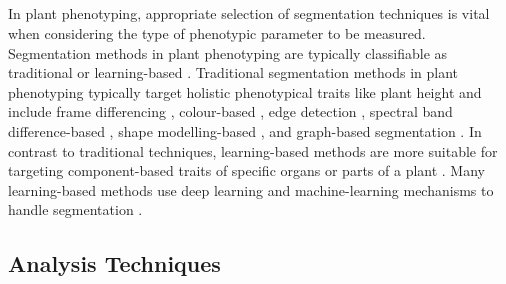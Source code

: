 \subparagraph{}
In plant phenotyping, appropriate selection of segmentation techniques is vital when considering the type of phenotypic parameter to be measured. Segmentation methods in plant phenotyping are typically classifiable as traditional or learning-based \cite{choudhurySegmentationTechniquesChallenges2020}. Traditional segmentation methods in plant phenotyping typically target holistic phenotypical traits like plant height and include frame differencing \cite{daschoudhuryHolisticComponentPlant2018}, colour-based \cite{hamudaSurveyImageProcessing2016a}, edge detection \cite{wangImageSegmentationOverlapping2018}, spectral band difference-based \cite{gampaDatadrivenApproachDetecting2019}, shape modelling-based \cite{chenLeafSegmentationFunctional2019}, and graph-based segmentation \cite{praveenkumarImageBasedLeaf2019}. In contrast to traditional techniques, learning-based methods are more suitable for targeting component-based traits of specific organs or parts of a plant \cite{choudhurySegmentationTechniquesChallenges2020}. Many learning-based methods use deep learning and machine-learning mechanisms to handle segmentation \cite{papeUtilizingMachineLearning2015, abdallaFinetuningConvolutionalNeural2019}.

\subsection{Analysis Techniques}